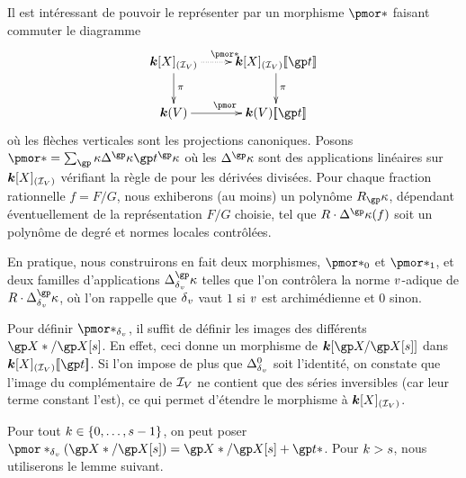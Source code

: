 Il est intéressant de pouvoir le représenter par un morphisme \( \pmor* \)
faisant commuter le diagramme
\begin{equation}
  \xymatrix{
    \cdn[X]_{(\ideal\anyvar)}                 \ar[d]^\pi \ar@{.>}[r]^{\pmor*}
    & \cdn[X]_{(\ideal\anyvar)} \series\psp   \ar[d]^\pi
    \\ \cdn(\anyvar)                                           \ar[r]^{\pmor}
    & \cdn(\anyvar)\series\psp
  }
\end{equation}
où les flèches verticales sont les projections canoniques. Posons
\( \pmor* = \sum_\derp \pdiff*^\derp \psp^\derp \) où les \( \pdiff*^\derp \)
sont des applications linéaires sur \( {\boldsymbol k}[X]_{(\mathcal I_{V})} \) vérifiant
la règle de  pour les dérivées divisées. Pour chaque fraction
rationnelle \( f = F/G \), nous exhiberons (au moins) un polynôme \( R_\derp
\), dépendant éventuellement de la représentation \( F/G \) choisie, tel que
\( R \cdot \pdiff*^\derp(f) \) soit un polynôme de degré et normes locales
contrôlées.

En pratique, nous construirons en fait deux morphismes, \( \pmor*_0 \) et \(
  \pmor*_1 \), et deux familles d'applications \( \pdiff^\derp \) telles que
l'on contrôlera la norme \( v \)-adique de \( R \cdot \pdiff^\derp \), où
l'on rappelle que \( {\delta\smash{_v}} \) vaut \( 1 \) si \( v \) est archimédienne et
\( 0 \) sinon.

Pour définir \( \pmor*_\dv \), il suffit de définir les images des différents
\( \vp* / \vp[\anydim] \). En effet, ceci donne un morphisme de \( \cdn[ \vp /
  \vp[\anydim] ] \) dans \( \cdn[X]_{(\ideal\anyvar)} \series\psp \). Si l'on
impose de plus que \( \pdiff^0 \) soit l'identité, on constate que l'image du
complémentaire de \( \mathcal I_{V} \) ne contient que des séries inversibles
(car leur terme constant l'est), ce qui permet d'étendre le morphisme à \(
  {\boldsymbol k}[X]_{(\mathcal I_{V})} \).

Pour tout \( k \in \lbrace0, \dots, s-1\rbrace \), on peut poser \(
  \pmor*_\dv(\vp*/\vp[\anydim]) = \vp*/\vp[\anydim] + \psp* \). Pour \( k >
  s \), nous utiliserons le lemme suivant.


